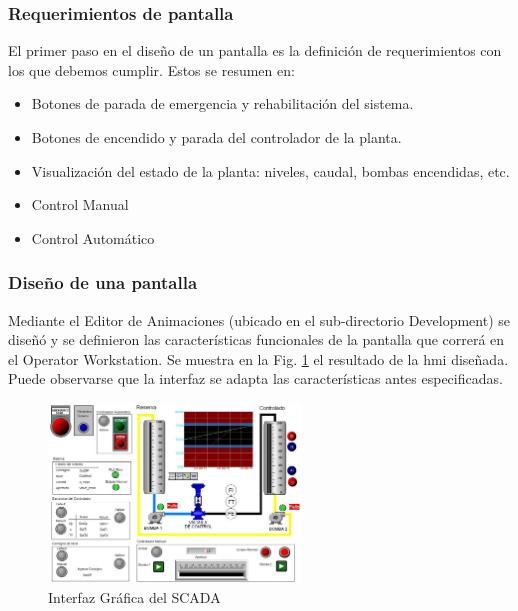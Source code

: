 \subsubsection{Requerimientos de pantalla}
El primer paso en el diseño de un pantalla es la definición de requerimientos 
con los que debemos cumplir. Estos se resumen en:
\begin{itemize}
 \item Botones de parada de emergencia y rehabilitación del sistema.
 \item Botones de encendido y parada del controlador de la planta.
 \item Visualización del estado de la planta: niveles, caudal, bombas
 encendidas, etc.
 \item Control Manual
 \item Control Automático
\end{itemize}

\subsubsection{Diseño de una pantalla}
Mediante el Editor de Animaciones (ubicado en el sub-directorio
Development) se diseñó y se definieron las características funcionales de 
la pantalla que correrá en el Operator Workstation. Se muestra en la Fig. 
\ref{fig:hmiscada} el resultado de la \gls{hmi} diseñada.
Puede observarse que la interfaz se adapta las características antes
especificadas.
  \begin{figure}[!ht]
	\centering
	\includegraphics[width=0.6\textwidth]
	{Cap5-SCADA/images/hmiScada.jpeg}
	\caption{Interfaz Gráfica del SCADA}
	\label{fig:hmiscada}
  \end{figure}


